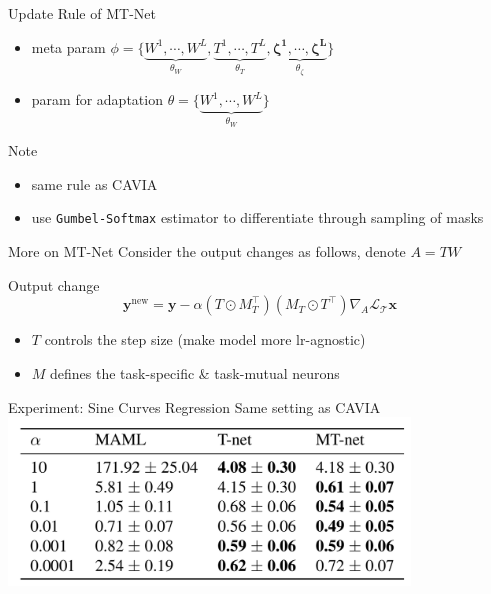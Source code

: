 \documentclass{beamer}
\begin{document}
\begin{frame}{Update Rule of MT-Net}
  \begin{itemize}
    \item meta param $\phi = \lbrace \underbrace{W^1,\cdots,W^L}_{\theta_W},\underbrace{T^1,\cdots,T^L}_{\theta_T},\underbrace{\mathbf{\zeta^1},\cdots,\mathbf{\zeta^L}}_{\theta_\zeta} \rbrace$
    \item param for adaptation $\theta = \lbrace \underbrace{W^1,\cdots,W^L}_{\theta_W} \rbrace$
  \end{itemize}

  Note
  \begin{itemize}
    \item same rule as CAVIA
    \item use \texttt{Gumbel-Softmax} estimator to differentiate through sampling of masks
  \end{itemize}
\end{frame}

\begin{frame}{More on MT-Net}
  Consider the output changes as follows, denote $A=TW$

  \begin{block}{Output change}
    \[ \mathbf{y}^{\text{new}} = \mathbf{y} - \alpha (T \odot M_T^{\top}) (M_T \odot T^{\top}) \nabla_A \mathcal{L}_{\mathcal{T}}\mathbf{x} \]
  \end{block}

  \begin{itemize}
    \item $T$ controls the step size (make model more lr-agnostic)
    \item $M$ defines the task-specific \& task-mutual neurons
  \end{itemize}
\end{frame}

\begin{frame}{Experiment: Sine Curves Regression}
  Same setting as CAVIA
  \center \includegraphics[width=0.8\textwidth]{fig/MT-sine.png}
\end{frame}
\end{document}
